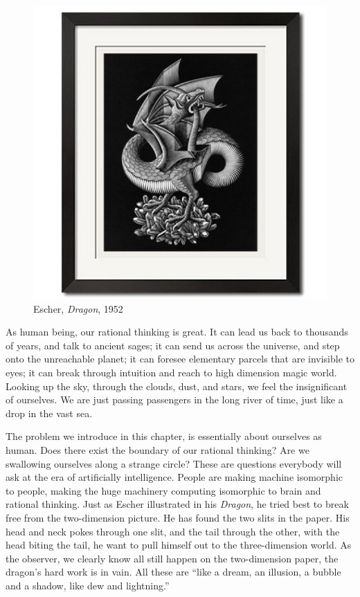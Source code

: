 \documentclass{article}
\begin{document}
\begin{figure}
 \centering
 \includegraphics[scale=0.8]{img/Escher-Dragon.png}
 \caption{Escher, {\em Dragon}, 1952}
 \label{fig:Escher-Dragon}
\end{figure}

As human being, our rational thinking is great. It can lead us back to thousands of years, and talk to ancient sages; it can send us across the universe, and step onto the unreachable planet; it can foresee elementary parcels that are invisible to eyes; it can break through intuition and reach to high dimension magic world. Looking up the sky, through the clouds, dust, and stars, we feel the insignificant of ourselves. We are just passing passengers in the long river of time, just like a drop in the vast sea.

The problem we introduce in this chapter, is essentially about ourselves as human. Does there exist the boundary of our rational thinking? Are we swallowing ourselves along a strange circle? These are questions everybody will ask at the era of artificially intelligence. People are making machine isomorphic to people, making the huge machinery computing isomorphic to brain and rational thinking. Just as Escher illustrated in his {\em Dragon}, he tried best to break free from the two-dimension picture. He has found the two slits in the paper. His head and neck pokes through one slit, and the tail through the other, with the head biting the tail, he want to pull himself out to the three-dimension world. As the observer, we clearly know all still happen on the two-dimension paper, the dragon's hard work is in vain. All these are ``like a dream, an illusion, a bubble and a shadow, like dew and lightning.''
\end{document}
